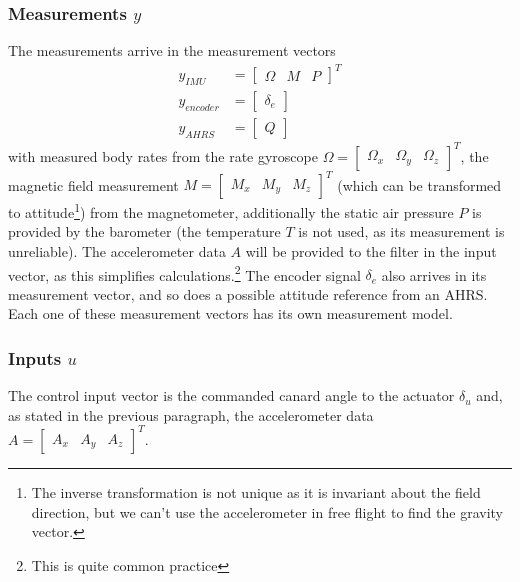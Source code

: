 \subsubsection{Measurements $y$}
The measurements arrive in the measurement vectors
\begin{align}
    y_{IMU} &=  \begin{bmatrix}
    \Omega & M & P
    \end{bmatrix}^T 
    \\
    y_{encoder} &=  \begin{bmatrix}
    \delta_e
    \end{bmatrix}
    \\
    y_{AHRS} &=  \begin{bmatrix}
    Q
    \end{bmatrix}
\end{align}
with measured body rates from the rate gyroscope $\Omega = \begin{bmatrix} \Omega_x & \Omega_y & \Omega_z \end{bmatrix}^T$, the magnetic field measurement $M = \begin{bmatrix} M_x & M_y & M_z \end{bmatrix}^T$ (which can be transformed to attitude\footnote{The inverse transformation is not unique as it is invariant about the field direction, but we can’t use the accelerometer in free flight to find the gravity vector.}) from the magnetometer, additionally the static air pressure $P$ is provided by the barometer (the temperature $T$ is not used, as its measurement is unreliable).
The accelerometer data $A$ will be provided to the filter in the input vector, as this simplifies calculations.\footnote{This is quite common practice}
The encoder signal $\delta_e$ also arrives in its measurement vector, and so does a possible attitude reference from an AHRS.
Each one of these measurement vectors has its own measurement model.

\subsubsection{Inputs $u$}
The control input vector is the commanded canard angle to the actuator $\delta_u$ and, as stated in the previous paragraph, the  accelerometer data $A = \begin{bmatrix} A_x & A_y & A_z \end{bmatrix}^T$.

